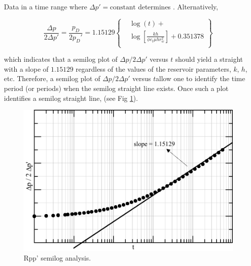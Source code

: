 \documentclass{llncs}
\numberwithin{equation}{section}
\numberwithin{figure}{section}
\numberwithin{table}{section}
\begin{document}
    Data in a time range where $\Delta p' = \text{constant}$ determines . Alternatively, 

    \begin{equation}
    \frac{\Delta p}{2\Delta p'}=\frac{{{p}_{D}}}{2{{p}_{D}}'}=\text{1}\text{.15129}\left\{ \begin{split}
    & \log \left( t \right)+ \\
    & \log \left[ \frac{kh}{\phi {{c}_{t}}\mu hr_{w}^{2}} \right]+\text{0}\text{.351378} \\
    \end{split} \right\}
        \label{Rpp_deltap}
    \end{equation}

    which indicates that a semilog plot of ${\Delta p}/{2\Delta p'}$ versus $t$ should yield a straight with a slope of $1.15129$ regardless of the values of the reservoir parameters, $k$, $h$, etc. Therefore, a semilog plot of ${\Delta p}/{2\Delta p'}$ versus $t$allow one to identify the time period (or periods) when the semilog straight line exists. Once such a plot identifies a semilog straight line,  (see Fig \ref{Rpp_Semilog}).

    \begin{figure}
        \begin{center}
        \includegraphics[scale=0.6]{Rpp_Semilog.pdf}
        \end{center}
        \caption{Rpp' semilog analysis.}
        \label{Rpp_Semilog}
    \end{figure}
\end{document}
